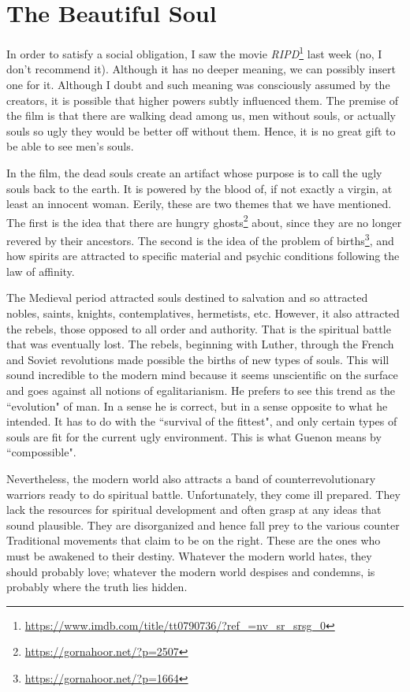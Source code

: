 \section{The Beautiful Soul}

In order to satisfy a social obligation, I saw the movie \textit{RIPD}\footnote{\url{https://www.imdb.com/title/tt0790736/?ref_=nv_sr_srsg_0}} last week (no, I don't recommend it). Although it has no deeper meaning, we can possibly insert one for it. Although I doubt and such meaning was consciously assumed by the creators, it is possible that higher powers subtly influenced them. The premise of the film is that there are walking dead among us, men without souls, or actually souls so ugly they would be better off without them. Hence, it is no great gift to be able to see men's souls.

In the film, the dead souls create an artifact whose purpose is to call the ugly souls back to the earth. It is powered by the blood of, if not exactly a virgin, at least an innocent woman. Eerily, these are two themes that we have mentioned. The first is the idea that there are hungry ghosts\footnote{\url{https://gornahoor.net/?p=2507}} about, since they are no longer revered by their ancestors. The second is the idea of the problem of births\footnote{\url{https://gornahoor.net/?p=1664}}, and how spirits are attracted to specific material and psychic conditions following the law of affinity.

The Medieval period attracted souls destined to salvation and so attracted nobles, saints, knights, contemplatives, hermetists, etc. However, it also attracted the rebels, those opposed to all order and authority. That is the spiritual battle that was eventually lost. The rebels, beginning with Luther, through the French and Soviet revolutions made possible the births of new types of souls. This will sound incredible to the modern mind because it seems unscientific on the surface and goes against all notions of egalitarianism. He prefers to see this trend as the ``evolution" of man. In a sense he is correct, but in a sense opposite to what he intended. It has to do with the ``survival of the fittest", and only certain types of souls are fit for the current ugly environment. This is what Guenon means by ``compossible".

Nevertheless, the modern world also attracts a band of counterrevolutionary warriors ready to do spiritual battle. Unfortunately, they come ill prepared. They lack the resources for spiritual development and often grasp at any ideas that sound plausible. They are disorganized and hence fall prey to the various counter Traditional movements that claim to be on the right. These are the ones who must be awakened to their destiny. Whatever the modern world hates, they should probably love; whatever the modern world despises and condemns, is probably where the truth lies hidden.

